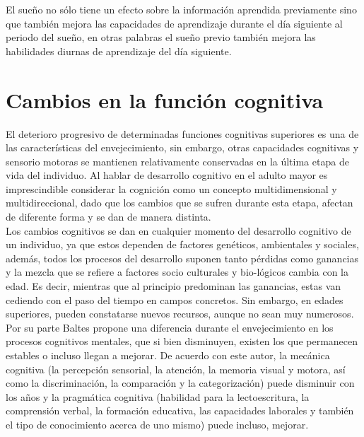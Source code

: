 \documentclass[letterpaper,titlepage,12pt,draft]{report}
\begin{document}
El sue\~no no s\'olo tiene un efecto sobre la informaci\'on aprendida previamente sino que tambi\'en mejora las capacidades de aprendizaje durante el d\'ia siguiente al periodo del sue\~no, en otras palabras el sue\~no previo tambi\'en mejora las habilidades diurnas de aprendizaje del d\'ia siguiente.


\section{Cambios en la funci\'on cognitiva}
El deterioro progresivo de determinadas funciones cognitivas superiores es una de las caracter\'isticas del envejecimiento, sin embargo, otras capacidades cognitivas y sensorio motoras se mantienen relativamente conservadas en la \'ultima etapa de vida del  individuo. Al hablar de desarrollo cognitivo en el adulto mayor es imprescindible considerar la cognici\'on como un concepto multidimensional y multidireccional, dado que los cambios que se sufren durante esta etapa, afectan de diferente forma y se dan de manera distinta.\\

Los cambios cognitivos se dan en cualquier momento del desarrollo cognitivo de un individuo, ya que estos dependen de factores gen\'eticos, ambientales y sociales, adem\'as, todos los procesos del desarrollo suponen tanto p\'erdidas como ganancias y la mezcla que se refiere a factores socio culturales y bio-l\'ogicos cambia con la edad. Es decir, mientras que al principio predominan las ganancias, estas van cediendo con el paso del tiempo en campos concretos. Sin embargo, en edades superiores, pueden constatarse nuevos recursos, aunque no sean muy numerosos.\\

Por su parte Baltes\cite{Baltes} propone una diferencia durante el envejecimiento en los procesos cognitivos mentales, que si bien disminuyen, existen los que permanecen estables o incluso llegan a mejorar. De acuerdo con este autor, la mec\'anica cognitiva (la percepci\'on sensorial, la atenci\'on, la memoria visual y motora, as\'i como la discriminaci\'on, la comparaci\'on y la categorizaci\'on) puede disminuir con los a\~nos y la pragm\'atica cognitiva (habilidad para la lectoescritura, la comprensi\'on verbal, la formaci\'on educativa, las capacidades laborales y tambi\'en el tipo de conocimiento acerca de uno mismo) puede incluso, mejorar.
\end{document}
